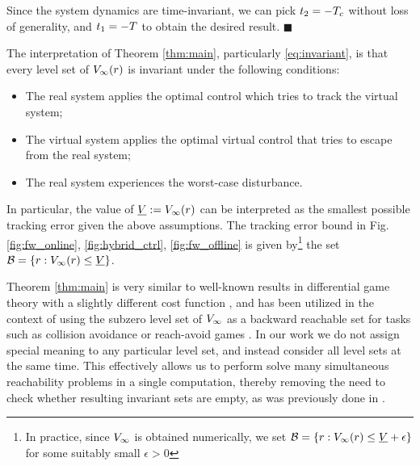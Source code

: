    Since the system dynamics are time-invariant, we can pick $t_2 = -T_c$ without loss of generality, and $t_1 = -T$ to obtain the desired result. \hfill $\blacksquare$
 
\begin{rem}
  The interpretation of Theorem \ref{thm:main}, particularly \eqref{eq:invariant}, is that every level set of $V_\infty(r)$ is invariant under the following conditions:
  \begin{itemize}
    \item The real system applies the optimal control which tries to track the virtual system;
    \item The virtual system applies the optimal virtual control that tries to escape from the real system;
    \item The real system experiences the worst-case disturbance.
  \end{itemize}
  
  In particular, the value of $\underline{V} := V_\infty(r)$ can be interpreted as the smallest possible tracking error  given the above assumptions. The tracking error bound in Fig. \ref{fig:fw_online}, \ref{fig:hybrid_ctrl}, \ref{fig:fw_offline} is given by\footnote{In practice, since $V_\infty$ is obtained numerically, we set $\mathcal B = \{r: V_\infty(r) \le \underline{V} + \epsilon\}$ for some suitably small $\epsilon>0$} the set $\mathcal B = \{r: V_\infty(r) \le \underline{V}\}$. 
  
\end{rem}
 
 
 \begin{rem} 
   Theorem \ref{thm:main} is very similar to well-known results in differential game theory with a slightly different cost function \cite{}, and has been utilized in the context of using the subzero level set of $V_\infty$ as a backward reachable set for tasks such as collision avoidance or reach-avoid games \cite{}. In our work we do not assign special meaning to any particular level set, and instead consider all level sets at the same time. This effectively allows us to perform solve many simultaneous reachability problems in a single computation, thereby removing the need to check whether resulting invariant sets are empty, as was previously done in .
 \end{rem}

